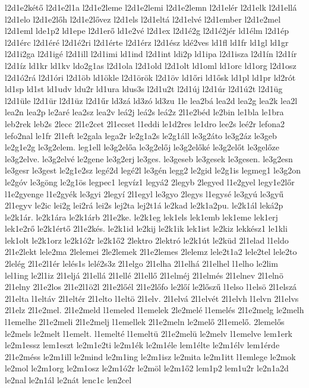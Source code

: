 {l2d1e2kétő
l2d1e2l1a
l2d1e2leme
l2d1e2lemi
l2d1e2lemn
l2d1elér
l2d1elk
l2d1ellá
l2d1elo
l2d1e2lőh
l2d1e2lővez
l2d1els
l2d1eltá
l2d1elvé
l2d1ember
l2d1e2mel
l2d1eml
lde1p2
ld1epe
l2d1erő
ld1e2vé
l2d1ex
l2d1é2g
l2d1é2jér
ld1élm
l2d1ép
l2d1érc
l2d1éré
l2d1é2ri
l2d1érte
l2d1érz
l2d1ész
ldé2ves
ld1fl
ld1fr
ld1gl
ld1gr
l2d1i2ga
l2d1igé
l2d1ill
l2d1imi
ld1ind
l2d1int
ldi2p
ld1ipa
l2d1isza
l2d1ín
l2d1ír
l2d1íz
ld1kr
ld1kv
ldo2g1as
l2d1ola
l2d1old
l2d1olt
ld1oml
ld1orc
ld1org
l2d1osz
l2d1ó2rá
l2d1óri
l2d1öb
ld1ökle
l2d1örök
l2d1öv
ld1őri
ld1ősk
ld1pl
ld1pr
ld2rót
ld1sp
ld1st
ld1udv
ldu2r
ld1ura
ldus3s
l2d1u2t
l2d1új
l2d1úr
l2d1ú2t
l2d1üg
l2d1üle
l2d1ür
l2d1üz
l2d1űr
ld3zá
ld3zó
ld3zu
1le
lea2bá
lea2d
lea2g
lea2k
lea2l
lea2n
lea2p
le2aré
lea2sz
lea2v
leá2j
leá2s
leá2z
2l1e2béd
le2bin
le1bla
le1bra
leb2rek
leb2s
2lecc
2l1e2cet
2l1ecset
l1eddi
le1d2res
le1dro
lee2s
leé2r
lefona2
lefo2nal
le1fr
2l1eft
le2gala
lega2r
le2g1a2s
le2g1áll
le3g2áto
le3g2áz
le3geb
le2g1e2g
le3g2elem.
leg1ell
le3g2előa
le3g2előj
le3g2előké
le3g2előt
le3gelőze
le3g2elve.
le3g2elvé
le2gene
le3g2erj
le3ges.
le3geseb
le3gesek
le3gesen.
le3g2esn
le3gesr
le3gest
le2g1e2sz
legé2d
legé2l
le3gén
legg2
le2gid
le2g1is
legmeg1
le3g2on
le2góv
le3göng
le2g1ös
legpec1
legvíz1
legyá2
2legyb
2legyed
l1e2gyel
legy1e2lőr
l1e2gyenge
l1e2gyék
le3gyi
2legyí
2l1egyl
le3gyo
2legys
l1egysé
le3gyú
le3gyű
2l1egyv
le2ic
lei2g
lei2rá
lei2s
lej2ta
lej2t1á
le2kad
le2k1a2pu.
le2k1ál
leká2p
le2k1ár.
le2k1ára
le2k1árb
2l1e2ke.
le2k1eg
lek1els
lek1emb
lek1eme
lek1erj
lek1e2rő
le2k1értő
2l1e2kés.
le2k1id
le2kij
le2k1ik
lek1ist
le2kiz
lekkész1
le1kli
lek1olt
le2k1orz
le2k1ó2r
le2k1ő2
2lektro
2lektró
le2k1út
le2küd
2l1elad
l1eldo
2l1e2lekt
lele2ma
2lelemei
2le2lemek
2l1e2lemes
2lelemz
lele2t1a2
lele2tel
lele2to
2lelég
2l1e2l1ér
lelés1s
lelé2s3z
2l1elgo
2l1elha
2l1elhá
2l1elhel
l1elho
le2lim
lel1ing
le2l1iz
2l1eljá
2l1ellá
2l1ellé
2l1ellő
2l1elméj
2l1elmés
2l1elnev
2l1elnö
2l1elny
2l1e2los
2l1e2l1ö2l
2l1e2lőél
2l1e2lőfo
le2lőí
le2lőszű
l1elso
l1elsö
2l1elszá
2l1elta
l1eltáv
2l1eltér
2l1elto
l1eltö
2l1elv.
2l1elvá
2l1elvét
2l1elvh
l1elvn
2l1elvs
2l1elz
2l1e2mel.
2l1e2meld
l1emeled
l1emelek
2le2melé
l1emelés
2l1e2melg
le2melh
l1emelhe
2l1e2meli
2l1e2melj
l1emellek
2l1e2meln
le2melő
2l1emelő.
2lemelős
le2mels
le2melt
l1emelt.
l1emelté
l1emeltü
2l1e2melü
le2melv
l1emelve
lem1erk
le2m1essz
lem1eszt
le2m1e2ti
le2m1ék
le2m1éle
lem1élte
le2m1élv
lem1érde
2l1e2méss
le2m1ill
le2mind
le2m1ing
le2m1isz
le2mita
le2m1itt
l1emlege
le2mok
le2mol
le2m1org
le2m1osz
le2m1ó2r
le2möl
le2m1ő2
lem1p2
lem1u2r
le2n1a2d
le2nal
le2n1ál
le2nát
lenc1c
len2cel
}
